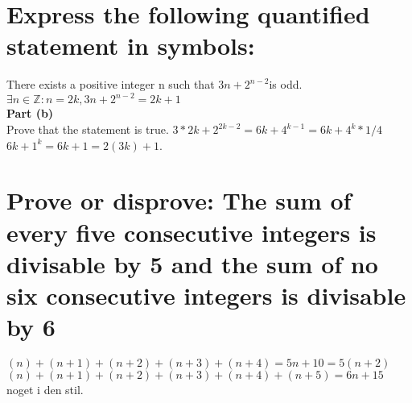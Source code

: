 \section{Express the following quantified statement in symbols:}
There exists a positive integer n such that $3n+2^{n-2}$is odd.\\
$\exists n \in \mathbb{Z} : n = 2k, 3n+2^{n-2} = 2k+1$\\
\textbf{Part (b)} \\
Prove that the statement is true.
$3*2k+2^{2k-2} = 6k+4^{k-1} = 6k+4^k*1/4$\\
$6k+1^k = 6k + 1 = 2(3k) + 1$.{\Huge\Bat}


\section{Prove or disprove: The sum of every five consecutive integers is divisable by 5 and the sum of no six consecutive integers is divisable by 6}
$(n)+(n+1)+(n+2)+(n+3)+(n+4) = 5n+10 = 5(n+2)$\\
$(n)+(n+1)+(n+2)+(n+3)+(n+4)+(n+5) = 6n+15$\\
noget i den stil.{\Huge\Bat}
{\Huge\Bat}

